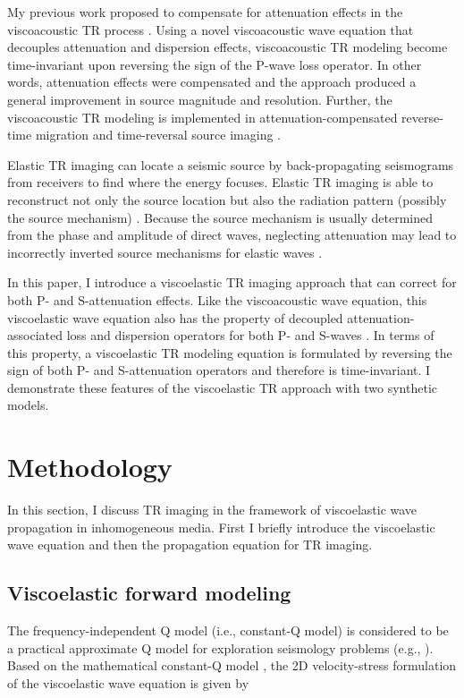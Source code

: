 My previous work proposed to compensate for attenuation effects in the viscoacoustic TR process \cite[]{zhu14b}. Using a novel viscoacoustic wave equation that decouples attenuation and dispersion effects, viscoacoustic TR modeling become time-invariant upon reversing the sign of the P-wave loss operator. In other words, attenuation effects were compensated and the approach produced a general improvement in source magnitude and resolution. Further, the viscoacoustic TR modeling is implemented in attenuation-compensated reverse-time migration \cite[]{zhu14d} and time-reversal source imaging \cite[]{zhu14b}.

Elastic TR imaging can locate a seismic source by back-propagating seismograms from receivers to find where the energy focuses. Elastic TR imaging is able to reconstruct not only the source location but also the radiation pattern (possibly the source mechanism) \cite[]{huMcMechan88,steiner08,kremers11}. Because the source mechanism is usually determined from the phase and amplitude of direct waves, neglecting attenuation may lead to incorrectly inverted source mechanisms for elastic waves \cite[]{eisner11}.

In this paper, I introduce a viscoelastic TR imaging approach that can correct for both P- and S-attenuation effects. Like the viscoacoustic wave equation, this viscoelastic wave equation also has the property of decoupled attenuation-associated loss and dispersion operators for both P- and S-waves \cite[]{zhu14c}. In terms of this property, a viscoelastic TR modeling equation is formulated by reversing the sign of both P- and S-attenuation operators and therefore is time-invariant. I demonstrate these features of the viscoelastic TR approach with two synthetic models. 


\section{Methodology}

In this section, I discuss TR imaging in the framework of viscoelastic wave propagation in inhomogeneous media. First I briefly introduce the viscoelastic wave equation and then the propagation equation for TR imaging.
\subsection{Viscoelastic forward modeling}
The frequency-independent Q model (i.e., constant-Q model) is considered to be a practical approximate Q model for exploration seismology problems (e.g., \citealp{zhu14d}). Based on the mathematical constant-Q model \cite[]{kja79}, the 2D velocity-stress formulation of the viscoelastic wave equation is given by \cite[]{zhu14c}


